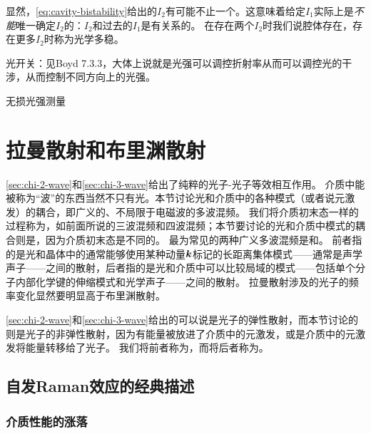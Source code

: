 显然，\eqref{eq:cavity-bistability}给出的$I_2$有可能不止一个。这意味着给定$I_1$实际上是\emph{不能}唯一确定$I_2$的：$I_2$和过去的$I_1$是有关系的。
在存在两个$I_2$时我们说腔体存在，存在更多$I_2$时称为光学多稳。

光开关：见Boyd 7.3.3，大体上说就是光强可以调控折射率从而可以调控光的干涉，从而控制不同方向上的光强。

无损光强测量

\section{拉曼散射和布里渊散射}\label{sec:general-four-wave}

\autoref{sec:chi-2-wave}和\autoref{sec:chi-3-wave}给出了纯粹的光子-光子等效相互作用。
介质中能被称为“波”的东西当然不只有光。本节讨论光和介质中的各种模式（或者说元激发）的耦合，即广义的、不局限于电磁波的多波混频。
我们将介质初末态一样的过程称为，如前面所说的三波混频和四波混频；本节要讨论的光和介质中模式的耦合则是，因为介质初末态是不同的。
最为常见的两种广义多波混频是和。
前者指的是光和晶体中的通常能够使用某种动量$\vb*{k}$标记的长距离集体模式——通常是声学声子——之间的散射，后者指的是光和介质中可以比较局域的模式——包括单个分子内部化学键的伸缩模式和光学声子——之间的散射。
拉曼散射涉及的光子的频率变化显然要明显高于布里渊散射。

\autoref{sec:chi-2-wave}和\autoref{sec:chi-3-wave}给出的可以说是光子的弹性散射，而本节讨论的则是光子的非弹性散射，因为有能量被放进了介质中的元激发，或是介质中的元激发将能量转移给了光子。
我们将前者称为，而将后者称为。

\subsection{自发Raman效应的经典描述}

\subsubsection{介质性能的涨落}

